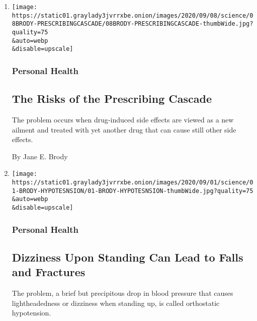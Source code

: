 \begin{enumerate}
\def\labelenumi{\arabic{enumi}.}
\item
  \href{/2020/09/07/well/live/prescription-medication-drug-side-effects-cascade.html}{}

  \texttt{[image: https://static01.graylady3jvrrxbe.onion/images/2020/09/08/science/08BRODY-PRESCRIBINGCASCADE/08BRODY-PRESCRIBINGCASCADE-thumbWide.jpg?quality=75\\\&auto=webp\\\&disable=upscale]}

  \hypertarget{personal-health}{%
  \subsubsection{Personal Health}\label{personal-health}}

  \hypertarget{the-risks-of-the-prescribing-cascade}{%
  \subsection{The Risks of the Prescribing
  Cascade}\label{the-risks-of-the-prescribing-cascade}}

  The problem occurs when drug-induced side effects are viewed as a new
  ailment and treated with yet another drug that can cause still other
  side effects.

  By Jane E. Brody
\item
  \href{/2020/08/31/well/live/dizziness-upon-standing-can-lead-to-falls-and-fractures.html}{}

  \texttt{[image: https://static01.graylady3jvrrxbe.onion/images/2020/09/01/science/01-BRODY-HYPOTESNSION/01-BRODY-HYPOTESNSION-thumbWide.jpg?quality=75\\\&auto=webp\\\&disable=upscale]}

  \hypertarget{personal-health-1}{%
  \subsubsection{Personal Health}\label{personal-health-1}}

  \hypertarget{dizziness-upon-standing-can-lead-to-falls-and-fractures}{%
  \subsection{Dizziness Upon Standing Can Lead to Falls and
  Fractures}\label{dizziness-upon-standing-can-lead-to-falls-and-fractures}}

  The problem, a brief but precipitous drop in blood pressure that
  causes lightheadedness or dizziness when standing up, is called
  orthostatic hypotension.


\end{enumerate}
